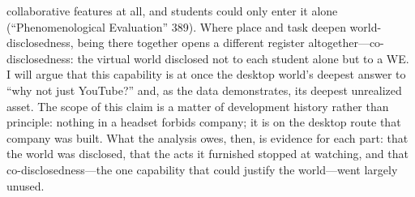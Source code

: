collaborative features at all, and students could only enter it alone
(``Phenomenological Evaluation'' 389). Where place and task deepen
world-disclosedness, being there together opens a different register
altogether---co-disclosedness: the virtual world disclosed not to each student
alone but to a WE. I will argue that this capability is at once the desktop
world's deepest answer to ``why not just YouTube?'' and, as the data
demonstrates, its deepest unrealized asset. The scope of this claim is a matter
of development history rather than principle: nothing in a headset forbids
company; it is on the desktop route that company was built. What the analysis
owes, then, is evidence for each part: that the world was disclosed, that
the acts it furnished stopped at watching, and that co-disclosedness---the
one capability that could justify the world---went largely unused.

